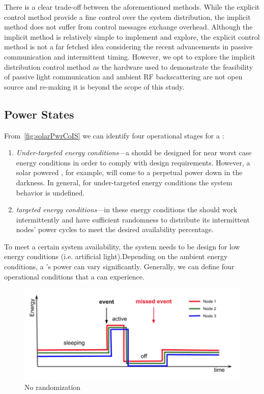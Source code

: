 There is a clear trade-off between the aforementioned methods. While the explicit control method provide a fine control over the system distribution, the implicit method does not suffer from control messages exchange overhead. Although the implicit method is relatively simple to implement and explore, the explicit control method is not a far fetched idea considering the recent advancements in passive communication and intermittent timing. However, we opt to explore the implicit distribution control method as the hardware used to demonstrate the feasibility of passive light communication and ambient RF backscattering are not open source and re-making it is beyond the scope of this study.

\subsection{Power States}
From~\ref{fig:solarPwrCoIS} we can identify four operational stages for a \sys:
\begin{enumerate}
		\item \textit{Under-targeted energy conditions}---a \sys should be designed for near worst case energy conditions in order to comply with design requirements. However, a solar powered \sys, for example,  will come to a perpetual power down in the darkness. In general, for under-targeted energy conditions the system behavior is undefined.
		\item \textit{targeted energy conditions}---in these energy conditions the \sys should work intermittently and have sufficient randomness to distribute its intermittent nodes' power cycles to meet the desired availability percentage. 
\end{enumerate}


To meet a certain system availability, the system needs to be design for low energy conditions (i.e. artificial light).Depending on the ambient energy conditions, a \sys's power can vary significantly.  Generally, we can define four operational conditions that a \sys can experience.

\begin{figure}
		\centering
		\includegraphics[width=\columnwidth]{figures/noRandomization}
		\caption{ No randomization}
		\label{fig:noRand}
\end{figure} 

